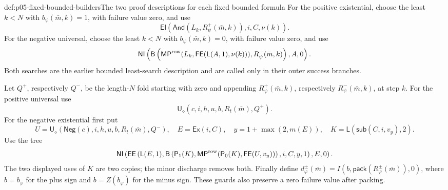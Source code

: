 \begin{hbdefinition}{def:p05-fixed-bounded-builders}{The two proof descriptions for each fixed bounded formula}
For the positive existential, choose the least \(k<N\) with
\(b_\psi(\bar m,k)=1\), with failure value zero, and use
\[
 \mathsf{EI}(\mathsf{And}(L_k,R_\psi^+(\bar m,k)),i,C,\nu(k)).
\]
For the negative universal, choose the least \(k<N\) with
\(b_\psi(\bar m,k)=0\), with failure value zero, and use
\[
 \mathsf{NI}\left(\mathsf B\left(
    \mathsf{MP}^{\rm row}(L_k,\mathsf{FE}(\mathsf L(A,1),\nu(k))),
                          R_\psi^-(\bar m,k)\right),A,0\right).
\]
Both searches are the earlier bounded least-search description and are
called only in their outer success branches.

Let \(Q^+\), respectively \(Q^-\), be the length-\(N\) fold starting
with zero and appending \(R_\psi^+(\bar m,k)\), respectively
\(R_\psi^-(\bar m,k)\), at step \(k\). For the positive universal use
\[
               \mathsf U_\diamond(c,i,h,u,b,R_t(\bar m),Q^+).
\]
For the negative existential first put
\[
 U=\mathsf U_\diamond(\mathsf{Neg}(c),i,h,u,b,R_t(\bar m),Q^-),
 \quad E=\mathsf{Ex}(i,C),\quad y=1+\max(2,m(E)),
 \quad K=\mathsf L(\mathsf{sub}(C,i,v_y),2).
\]
Use the tree
\[
 \mathsf{NI}\left(\mathsf{EE}\left(\mathsf L(E,1),
    \mathsf B\left(\mathsf P_1(K),
       \mathsf{MP}^{\rm row}(\mathsf P_0(K),\mathsf{FE}(U,v_y))\right),
                                    i,C,y,1\right),E,0\right).
\]
The two displayed uses of \(K\) are two copies; the minor discharge
removes both. Finally define
\(d_\varphi^\pm(\bar m)=I(b,\mathsf{pack}(R_\varphi^\pm(\bar m)),0)\),
where \(b=b_\varphi\) for the plus sign and \(b=Z(b_\varphi)\)
for the minus sign. These guards also preserve a zero failure value after
packing.
\end{hbdefinition}

